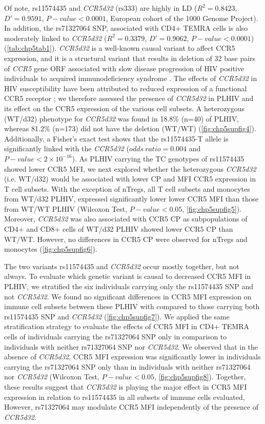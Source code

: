 \documentclass{book}
\begin{document}
\begin{refsection}
Of note, rs11574435 and \textit{CCR5d32} (rs333) are highly in LD ($R^2 = 0.8423$, $D' = 0.9591$, $P-value < 0.0001$, European cohort of the 1000 Genome Project).
In addition, the rs71327064 SNP, associated with CD4+ TEMRA cells is also moderately linked to \textit{CCR5d32} ($R^2 = 0.3379$, $D' = 0.9062$, $P-value < 0.0001$) (\ref{tab:chp5tab1}).
\textit{CCR5d32} is a well-known causal variant to affect CCR5 expression, and it is a structural variant that results in deletion of 32 base pairs of \textit{CCR5} gene ORF associated with slow disease progression of HIV positive individuals to acquired immunodeficiency syndrome \cite{Hütter2009Long}.
The effects of \textit{CCR5d32} in HIV susceptibility have been attributed to reduced expression of a functional CCR5 receptor \cite{Lederman2006Biology}; we therefore assessed the presence of \textit{CCR5d32} in PLHIV and its effect on the CCR5 expression of the various cell subsets.
A heterozygous (WT/d32) phenotype for \textit{CCR5d32} was found in 18.8\% (n=40) of PLHIV, whereas 81.2\% (n=173) did not have the deletion (WT/WT) (\ref{fig:chp5supfig4}).
Additionally, a Fisher's exact test shows that the rs11574435-T allele is significantly linked with the \textit{CCR5d32} ($odds~ratio = 0.004$ and $P-value < 2 \times 10^{-16}$).
As PLHIV carrying the TC genotypes of rs11574435 showed lower CCR5 MFI, we next explored whether the heterozygous \textit{CCR5d32} (i.e. WT/d32) would be associated with lower CP and MFI CCR5 expression in T cell subsets.
With the exception of nTregs, all T cell subsets and monocytes from WT/d32 PLHIV, expressed significantly lower lower CCR5 MFI than those from WT/WT PLHIV (Wilcoxon Test, $P-value < 0.05$, \ref{fig:chp5supfig5}).
Moreover, \textit{CCR5d32} was also associated with CCR5 CP as subpopulations of CD4+ and CD8+ cells of WT/d32 PLHIV showed lower CCR5 CP than WT/WT.
However, no differences in CCR5 CP were observed for nTregs and monocytes (\ref{fig:chp5supfig6}). 

The two variants rs11574435 and \textit{CCR5d32} occur mostly together, but not always.
To evaluate which genetic variant is causal to decreased CCR5 MFI in PLHIV, we stratified the six individuals carrying only the rs11574435 SNP and not \textit{CCR5d32}.
We found  no significant differences in CCR5 MFI expression on immune cell subsets between these PLHIV with compared to those carrying both rs11574435 SNP and \textit{CCR5d32} (\ref{fig:chp5supfig7}).
We applied the same stratification strategy to evaluate the effects of CCR5 MFI in CD4+ TEMRA cells of individuals carrying the rs71327064 SNP only in comparison to individuals with neither rs71327064 SNP nor \textit{CCR5d32}.
We observed that in the absence of \textit{CCR5d32}, CCR5 MFI expression was significantly lower in individuals carrying the rs71327064 SNP only than in individuals with neither rs71327064 nor \textit{CCR5d32} (Wilcoxon Test, $P-value < 0.05$, \ref{fig:chp5supfig8}).
Together, these results suggest that \textit{CCR5d32} is playing the major effect in CCR5 MFI expression in relation to rs11574435 in all subsets of immune cells evaluated, However, rs71327064 may modulate CCR5 MFI independently of the presence of \textit{CCR5d32}. 


\end{refsection}
\end{document}
